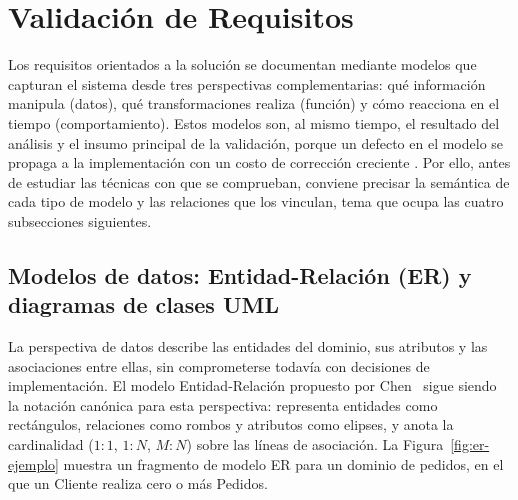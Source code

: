 \documentclass[11pt,a4paper,oneside]{report}
\begin{document}
	\section{Validaci\'on de Requisitos}
	
	Los requisitos orientados a la soluci\'on se documentan mediante modelos que capturan el sistema desde tres perspectivas complementarias: qu\'e informaci\'on manipula (datos), qu\'e transformaciones realiza (funci\'on) y c\'omo reacciona en el tiempo (comportamiento). Estos modelos son, al mismo tiempo, el resultado del an\'alisis y el insumo principal de la validaci\'on, porque un defecto en el modelo se propaga a la implementaci\'on con un costo de correcci\'on creciente \citep{pohl_2010}. Por ello, antes de estudiar las t\'ecnicas con que se comprueban, conviene precisar la sem\'antica de cada tipo de modelo y las relaciones que los vinculan, tema que ocupa las cuatro subsecciones siguientes.
	
	\subsection{Modelos de datos: Entidad-Relaci\'on (ER) y diagramas de clases UML}
	
	La perspectiva de datos describe las entidades del dominio, sus atributos y las asociaciones entre ellas, sin comprometerse todav\'ia con decisiones de implementaci\'on. El modelo Entidad-Relaci\'on propuesto por Chen~\citep{chen_1976} sigue siendo la notaci\'on can\'onica para esta perspectiva: representa entidades como rect\'angulos, relaciones como rombos y atributos como elipses, y anota la cardinalidad ($1{:}1$, $1{:}N$, $M{:}N$) sobre las l\'ineas de asociaci\'on. La Figura~\ref{fig:er-ejemplo} muestra un fragmento de modelo ER para un dominio de pedidos, en el que un \textsf{Cliente} realiza cero o m\'as \textsf{Pedidos}.
	
\end{document}

